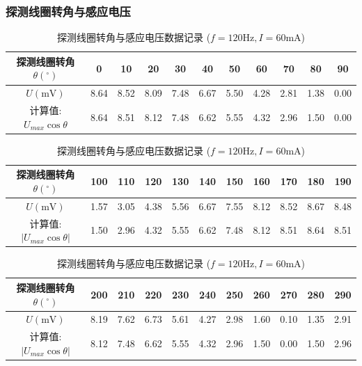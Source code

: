 \documentclass[11pt]{article}
\begin{document}
\subsubsection{探测线圈转角与感应电压}
\begin{table}[htbp]
    \centering
    \caption{探测线圈转角与感应电压数据记录 ($f=120\text{Hz}, I=60\text{mA}$)}
    \label{tab:coil_rotation}
    \setlength{\tabcolsep}{4pt} %
    
    \begin{tabular}{ccccccccccc}
        \toprule
        探测线圈转角 $\theta (^\circ)$ & 0 & 10 & 20 & 30 & 40 & 50 & 60 & 70 & 80 & 90 \\
        \midrule
        $U (\text{mV})$ & 8.64 & 8.52 & 8.09 & 7.48 & 6.67 & 5.50 & 4.28 & 2.81 & 1.38 & 0.00 \\
        计算值: $U_{max}\cos\theta$ & 8.64 & 8.51 & 8.12 & 7.48 & 6.62 & 5.55 & 4.32 & 2.96 & 1.50 & 0.00 \\
        \bottomrule
    \end{tabular}

    \vspace{1em}

    \begin{tabular}{ccccccccccc}
        \toprule
        探测线圈转角 $\theta (^\circ)$ & 100 & 110 & 120 & 130 & 140 & 150 & 160 & 170 & 180 & 190 \\
        \midrule
        $U (\text{mV})$ & 1.57 & 3.05 & 4.38 & 5.56 & 6.67 & 7.55 & 8.12 & 8.52 & 8.67 & 8.48 \\
        计算值: $|U_{max}\cos\theta|$ & 1.50 & 2.96 & 4.32 & 5.55 & 6.62 & 7.48 & 8.12 & 8.51 & 8.64 & 8.51 \\
        \bottomrule
    \end{tabular}

    \vspace{1em}

    \begin{tabular}{ccccccccccc}
        \toprule
        探测线圈转角 $\theta (^\circ)$ & 200 & 210 & 220 & 230 & 240 & 250 & 260 & 270 & 280 & 290 \\
        \midrule
        $U (\text{mV})$ & 8.19 & 7.62 & 6.73 & 5.61 & 4.27 & 2.98 & 1.60 & 0.10 & 1.35 & 2.91 \\
        计算值: $|U_{max}\cos\theta|$ & 8.12 & 7.48 & 6.62 & 5.55 & 4.32 & 2.96 & 1.50 & 0.00 & 1.50 & 2.96 \\
        \bottomrule
    \end{tabular}


\end{table}
\end{document}
